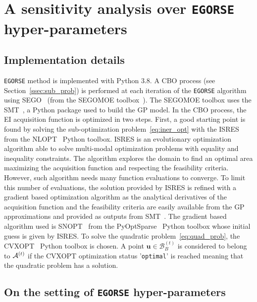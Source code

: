 \section{A sensitivity analysis over \texttt{EGORSE} hyper-parameters}
\label{sec:sensitivity-anal}
\subsection{Implementation details}

\texttt{EGORSE} method is implemented with Python 3.8. A CBO process (see Section~\ref{ssec:sub_prob}) is performed at each iteration of the \texttt{EGORSE} algorithm
using SEGO~\cite{SasenaExplorationmetamodelingsampling2002}  (from the SEGOMOE toolbox~\cite{bartoliAdaptiveModelingStrategy2019}).
The SEGOMOE toolbox uses the SMT~\cite{bouhlelPythonSurrogateModeling2019}, a Python package used to build the GP model.
In the CBO process, the EI acquisition function is optimized in two steps. 
First, a good starting point is found by solving the sub-optimization problem~\eqref{eq:iner_opt} with the ISRES~\cite{runarsson2005search} from the NLOPT~\cite{johnson2014nlopt} Python toolbox.
ISRES is an evolutionary optimization algorithm able to solve multi-modal optimization problems with equality and inequality constraints.
The algorithm explores the domain to find an optimal area maximizing the acquisition function and respecting the feasibility criteria.
However, such algorithm needs many function evaluations to converge.
To limit this number of evaluations, the solution provided by ISRES is refined with a gradient based optimization algorithm as the analytical derivatives of the acquisition function and the feasibility criteria are easily available from the GP approximations and provided as outputs from SMT~\cite{bouhlelPythonSurrogateModeling2019}.
The gradient based algorithm used is SNOPT~\cite{Gillsnopt2005} from the PyOptSparse~\cite{Perezpyopt2012} Python toolbox whose initial guess is given by ISRES.
To solve the quadratic problem~\eqref{eq:quad_prob}, the CVXOPT~\cite{andersen2013cvxopt} Python toolbox is chosen.
A point $\bm{u}\in\mathcal{B}_B^{(t)}$ is considered to belong to ${\mathcal{A}}^{(t)}$ if the CVXOPT optimization status '\verb'optimal'' is reached meaning that the quadratic problem has a solution.

\subsection{On the setting of \texttt{EGORSE} hyper-parameters}
\label{sssec:hyperparam}

